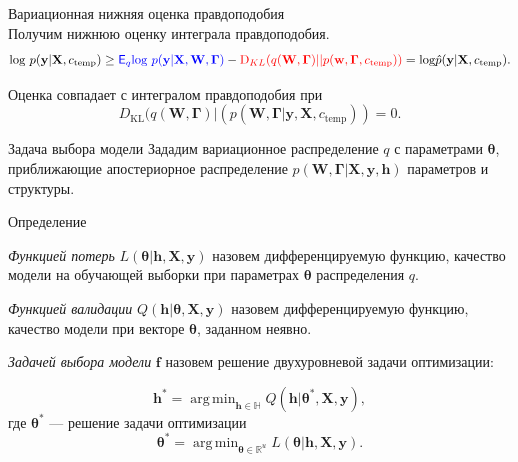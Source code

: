 \documentclass[usenames,dvipsnames,11pt,pdf,utf8,russian,aspectratio=43]{beamer}
\DeclareMathOperator*{\argmin}{arg\,min}
\begin{document}
\begin{frame}{Вариационная нижняя оценка правдоподобия}
~\\Получим нижнюю оценку интеграла правдоподобия.
$$                                                                                                                                              
        \text{log}~p(\mathbf{y}|\mathbf{X}, c_\text{temp}) \geq 
\textcolor{blue}{\mathsf{E}_q \text{log}~{p(\mathbf{y} | \mathbf{X}, \mathbf{W}, \boldsymbol{\Gamma})}} - \textcolor{red}{\text{D}_{KL}(q(\mathbf{W}, \boldsymbol{\Gamma})||p(\mathbf{w}, \boldsymbol{\Gamma}, c_\text{temp}))} = \text{log}\hat{{p}}(\mathbf{y}|\mathbf{X}, c_\text{temp}).
$$ 



Оценка совпадает с интегралом правдоподобия при $$D_\text{KL}(q(\mathbf{W}, \boldsymbol{\Gamma})|(p(\mathbf{W}, \boldsymbol{\Gamma}|\mathbf{y}, \mathbf{X}, c_\text{temp}))=0.$$

\end{frame}      


\begin{frame}{Задача выбора модели}
\footnotesize
Зададим вариационное распределение $q$ с параметрами $\boldsymbol{\theta}$, приближающие апостериорное распределение $p(\mathbf{W}, \boldsymbol{\Gamma}|\mathbf{X}, \mathbf{y}, \mathbf{h})$ параметров и структуры.



\begin{block}{Определение}

\textit{Функцией потерь} $L( \boldsymbol{\theta}| \mathbf{h}, \mathbf{X}, \mathbf{y})$   назовем дифференцируемую функцию, качество модели на обучающей выборки при параметрах $\boldsymbol{\theta}$ распределения $q$.
\end{block}
\begin{block}{}
\textit{Функцией валидации} $Q(\mathbf{h}| \boldsymbol{\theta}, \mathbf{X}, \mathbf{y} )$ назовем дифференцируемую функцию, качество модели при векторе $\boldsymbol{\theta}$, заданном неявно.
\end{block}
\begin{block}{}
\textit{Задачей выбора модели} $\mathbf{f}$ назовем решение двухуровневой задачи оптимизации:

\[
	\mathbf{h}^{*} = \argmin_{\mathbf{h} \in \mathbb{H}} Q(\mathbf{h}|  \boldsymbol{\theta}^{*}, \mathbf{X}, \mathbf{y} ),
\]
где $\boldsymbol{\theta}^{*}$ --- решение задачи оптимизации
\[
   \boldsymbol{\theta}^{*} = \argmin_{\boldsymbol{\theta} \in \mathbb{R}^u} L(\boldsymbol{\theta}|  \mathbf{h},  \mathbf{X}, \mathbf{y}).
\]
\end{block}


\end{frame}
\end{document}
